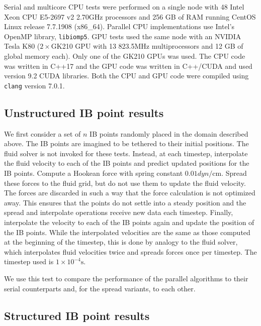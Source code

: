 Serial and multicore CPU tests were performed on a single node with 48
Intel\textsuperscript{\textregistered} Xeon\textsuperscript{\textregistered}
CPU E5-2697 v2 2.70\si{\giga\hertz} processors and 256 GB of RAM running CentOS
Linux release 7.7.1908 (x86\_64). Parallel CPU implementations use Intel's
OpenMP library, \texttt{libiomp5}. GPU tests used the same node with an
NVIDIA\textsuperscript{\textregistered} Tesla\textsuperscript{\textregistered}
K80 ($2\times$GK210 GPU with 13 823.5\si{\mega\hertz} multiprocessors and 12
GB of global memory each). Only one of the GK210 GPUs was used. The CPU code
was written in C++17 and the GPU code was written in C++/CUDA and used version
9.2 CUDA libraries. Both the CPU and GPU code were compiled using
\texttt{clang} version 7.0.1.

\subsection{Unstructured IB point results}

We first consider a set of $n$ IB points randomly placed in the domain
described above. The IB points are imagined to be tethered to their initial
positions. The fluid solver is not invoked for these tests. Instead, at each
timestep, interpolate the fluid velocity to each of the IB points and predict
updated positions for the IB points. Compute a Hookean force with spring
constant $0.01\si{dyn\per\centi\meter}$. Spread these forces to the fluid grid,
but do not use them to update the fluid velocity. The forces are discarded in
such a way that the force calculation is not optimized away. This ensures that
the points do not settle into a steady position and the spread and interpolate
operations receive new data each timestep. Finally, interpolate the velocity to
each of the IB points again and update the position of the IB points. While the
interpolated velocities are the same as those computed at the beginning of the
timestep, this is done by analogy to the fluid solver, which interpolates fluid
velocities twice and spreads forces once per timestep. The timestep used is
$1\times 10^{-4}\si{\second}$.

We use this test to compare the performance of the parallel algorithms to
their serial counterparts and, for the spread variants, to each other.





\subsection{Structured IB point results}

